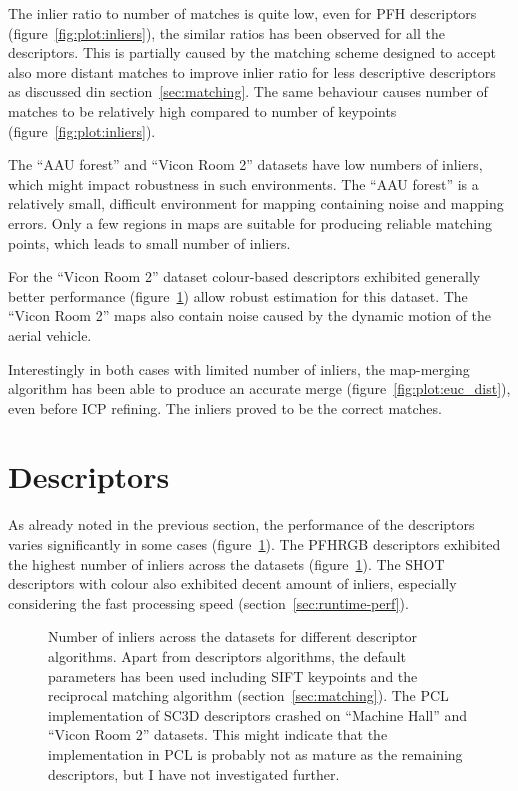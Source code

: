 The inlier ratio to number of matches is quite low, even for \gls{PFH} descriptors (figure~\ref{fig:plot:inliers}), the similar ratios has been observed for all the descriptors. This is partially caused by the matching scheme designed to accept also more distant matches to improve inlier ratio for less descriptive descriptors as discussed din section~\ref{sec:matching}. The same behaviour causes number of matches to be relatively high compared to number of keypoints (figure~\ref{fig:plot:inliers}).

The ``AAU forest'' and ``Vicon Room 2'' datasets have low numbers of inliers, which might impact robustness in such environments. The ``AAU forest'' is a relatively small, difficult environment for mapping containing noise and mapping errors. Only a few regions in maps are suitable for producing reliable matching points, which leads to small number of inliers.

For the ``Vicon Room 2'' dataset colour-based descriptors exhibited generally better performance (figure~\ref{fig:plot:desc_inliers}) allow robust estimation for this dataset. The ``Vicon Room 2'' maps also contain noise caused by the dynamic motion of the aerial vehicle.

Interestingly in both cases with limited number of inliers, the map-merging algorithm has been able to produce an accurate merge (figure~\ref{fig:plot:euc_dist}), even before \gls{ICP} refining. The inliers proved to be the correct matches.

\section{Descriptors}

As already noted in the previous section, the performance of the descriptors varies significantly in some cases (figure~\ref{fig:plot:desc_inliers}). The \gls{PFHRGB} descriptors exhibited the highest number of inliers across the datasets (figure~\ref{fig:plot:desc_inliers}). The \gls{SHOT} descriptors with colour also exhibited decent amount of inliers, especially considering the fast processing speed (section~\ref{sec:runtime-perf}).

\begin{figure}
  \centering
  
  \caption{Number of inliers across the datasets for different descriptor algorithms. Apart from descriptors algorithms, the default parameters has been used including \gls{SIFT} keypoints and the reciprocal matching algorithm (section~\ref{sec:matching}). The \gls{PCL} implementation of \gls{SC3D} descriptors crashed on ``Machine Hall'' and ``Vicon Room 2'' datasets. This might indicate that the implementation in \gls{PCL} is probably not as mature as the remaining descriptors, but I have not investigated further.}
  \label{fig:plot:desc_inliers}
\end{figure}

